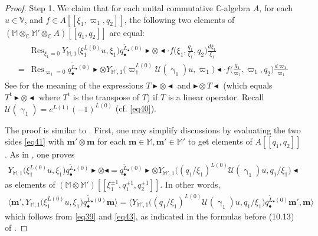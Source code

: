 \documentclass[11pt,b5paper,notitlepage]{article}
\theoremstyle{definition}
\theoremstyle{plain}
\newcommand{\mc}{\mathcal}
\newcommand{\wtd}{\widetilde}
\newcommand{\tr}{\mathrm{t}} %
\newcommand{\Res}{\mathrm{Res}}
\newcommand{\mbf}{\mathbf}
\newcommand{\blt}{\bullet}
\newcommand{\Vbb}{\mathbb V}
\newcommand{\Mbb}{\mathbb M}
\newcommand{\Cbb}{\mathbb C}
\newcommand{\btl}{\blacktriangleleft}
\newcommand{\btr}{\blacktriangleright}
\newcommand{\<}{\left\langle}
\renewcommand{\>}{\right\rangle}
\newcommand{\bigbk}[1]{\big\langle {#1}\big\rangle}
\numberwithin{equation}{section}
\begin{document}
\begin{proof}
Step 1. We claim that for each unital commutative $\Cbb$-algebra $A$, for each   $u\in\Vbb$, and $f\in A[[\xi_1,\varpi_1,q_2]]$,  the following two elements of $(\Mbb\otimes_\Cbb\Mbb'\otimes_\Cbb A)[[q_1,q_2]]$ are equal:
\begin{align}\label{eq41}
\begin{aligned}
&\Res_{\xi_1=0}~Y_{\Mbb,1}\big(\xi_1^{L(0)}u,\xi_1\big)q_\blt^{\wtd L_\blt(0)}\btr\otimes \btl\cdot f\big(\xi_1,\frac{q_1}{\xi_1},q_2\big)\frac{d\xi_1}{\xi_1}\\
=&\Res_{\varpi_1=0}~q_\blt^{\wtd L_\blt(0)}\btr\otimes Y_{\Mbb',1}\big(\varpi_1^{L(0)}\mc U(\upgamma_1)u,\varpi_1\big)\btl\cdot f\big(\frac{q_1}{\varpi_1},\varpi_1,q_2\big)\frac{d\varpi_1}{\varpi_1}
\end{aligned}
\end{align}
See \cite[(10.2,10.3)]{Gui-sewingconvergence} for the meaning of the expressions $T\btr\otimes\btl$ and $\btr\otimes T\btl$ (which equals $T^\tr\btr\otimes\btl$ where $T^\tr$ is the transpose of $T$) if $T$ is a linear operator. Recall $\mc U(\upgamma_1)=e^{L(1)}(-1)^{L(0)}$ (cf. \eqref{eq40}).

The proof is similar to \cite[Lem. 10.2]{Gui-sewingconvergence}. First, one may simplify discussions by evaluating the two sides \eqref{eq41} with $\mbf m'\otimes\mbf m$ for each $\mbf m\in\Mbb,\mbf m'\in\Mbb'$ to get elements of $A[[q_1,q_2]]$. As in \cite[(10.13)]{Gui-sewingconvergence}, one proves
\begin{align}
Y_{\Mbb,1}\big(\xi_1^{L(0)}u,\xi_1\big)q_\blt^{\wtd L_\blt(0)}\btr\otimes \btl=q_\blt^{\wtd L_\blt(0)}\btr\otimes Y_{\Mbb',1}\big((q_1/\xi_1)^{L(0)}\mc U(\upgamma_1)u,q_1/\xi_1\big)\btl  \label{eq42}
\end{align}
as elements of $(\Mbb\otimes\Mbb')[[\xi_1^{\pm1},q_1^{\pm1},q_2^{\pm1}]]$. In other words,
\begin{align}
\bigbk{\mbf m',Y_{\Mbb,1}\big(\xi_1^{L(0)}u,\xi_1\big)q_\blt^{\wtd L_\blt(0)}\mbf m}=\bigbk{Y_{\Mbb',1}\big((q_1/\xi_1)^{L(0)}\mc U(\upgamma_1)u,q_1/\xi_1\big)q_\blt^{\wtd L_\blt(0)}\mbf m', \mbf m}
\end{align}
which follows from \eqref{eq39} and \eqref{eq43}, as indicated in the formulas before (10.13) of \cite{Gui-sewingconvergence}.


\end{proof}
\end{document}
